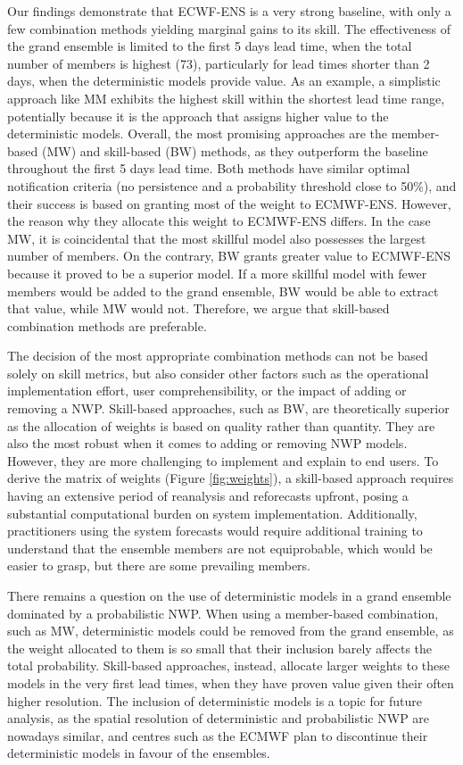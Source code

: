 \documentclass[preprint,12pt,authoryear]{elsarticle}
\begin{document}
Our findings demonstrate that ECWF-ENS is a very strong baseline, with only a few combination methods yielding marginal gains to its skill. The effectiveness of the grand ensemble is limited to the first 5 days lead time, when the total number of members is highest (73), particularly for lead times shorter than 2 days, when the deterministic models provide value. As an example, a simplistic approach like MM exhibits the highest skill within the shortest lead time range, potentially because it is the approach that assigns higher value to the deterministic models. Overall, the most promising approaches are the member-based (MW) and skill-based (BW) methods, as they outperform the baseline throughout the first 5 days lead time. Both methods have similar optimal notification criteria (no persistence and a probability threshold close to 50\%), and their success is based on granting most of the weight to ECMWF-ENS. However, the reason why they allocate this weight to ECMWF-ENS differs. In the case MW, it is coincidental that the most skillful model also possesses the largest number of members. On the contrary, BW grants greater value to ECMWF-ENS because it proved to be a superior model. If a more skillful model with fewer members would be added to the grand ensemble, BW would be able to extract that value, while MW would not. Therefore, we argue that skill-based combination methods are preferable. 

The decision of the most appropriate combination methods can not be based solely on skill metrics, but also consider other factors such as the  operational implementation effort, user comprehensibility, or the impact of adding or removing a NWP. Skill-based approaches, such as BW, are theoretically superior as the allocation of weights is based on quality rather than quantity. They are also the most robust when it comes to adding or removing NWP models. However, they are more challenging to implement and explain to end users. To derive the matrix of weights (Figure \ref{fig:weights}), a skill-based approach requires having an extensive period of reanalysis and reforecasts upfront, posing a substantial computational burden on system implementation. Additionally,  practitioners using the system forecasts would require additional training to understand that the ensemble members are not equiprobable, which would be easier to grasp, but there are some prevailing members.

There remains a question on the use of deterministic models in a grand ensemble dominated by a probabilistic NWP. When using a member-based combination, such as MW, deterministic models could be removed from the grand ensemble, as the weight allocated to them is so small that their inclusion barely affects the total probability. Skill-based approaches, instead, allocate larger weights to these models in the very first lead times, when they have proven value given their often higher resolution. The inclusion of deterministic models is a topic for future analysis, as the spatial resolution of deterministic and probabilistic NWP are nowadays similar, and centres such as the ECMWF plan to discontinue their deterministic models in favour of the ensembles.
\end{document}
